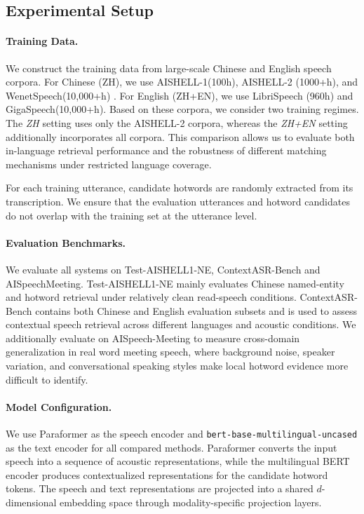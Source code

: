 \documentclass[letterpaper]{article} %
\begin{document}
\subsection{Experimental Setup}

\paragraph{Training Data.}
We construct the training data from large-scale Chinese and English speech corpora. For Chinese (ZH), we use AISHELL-1(100h), AISHELL-2 (1000+h), and WenetSpeech(10,000+h) . For English (ZH+EN), we use LibriSpeech (960h) and GigaSpeech(10,000+h). Based on these corpora, we consider two training regimes. The \textit{ZH} setting uses only the AISHELL-2 corpora, whereas the \textit{ZH+EN} setting additionally incorporates all corpora. This comparison allows us to evaluate both in-language retrieval performance and the robustness of different matching mechanisms under restricted language coverage.

For each training utterance, candidate hotwords are randomly extracted from its transcription. We ensure that the evaluation utterances and hotword candidates do not overlap with the training set at the utterance level.

\paragraph{Evaluation Benchmarks.}
We evaluate all systems on Test-AISHELL1-NE, ContextASR-Bench and AISpeechMeeting. Test-AISHELL1-NE mainly evaluates Chinese named-entity and hotword retrieval under relatively clean read-speech conditions. ContextASR-Bench contains both Chinese and English evaluation subsets and is used to assess contextual speech retrieval across different languages and acoustic conditions. We additionally evaluate on AISpeech-Meeting to measure cross-domain generalization in real word meeting speech, where background noise, speaker variation, and conversational speaking styles make local hotword evidence more difficult to identify.


\paragraph{Model Configuration.}
We use Paraformer as the speech encoder and \texttt{bert-base-multilingual-uncased} as the text encoder for all compared methods. Paraformer converts the input speech into a sequence of acoustic representations, while the multilingual BERT encoder produces contextualized representations for the candidate hotword tokens. The speech and text representations are projected into a shared $d$-dimensional embedding space through modality-specific projection layers.
\end{document}
